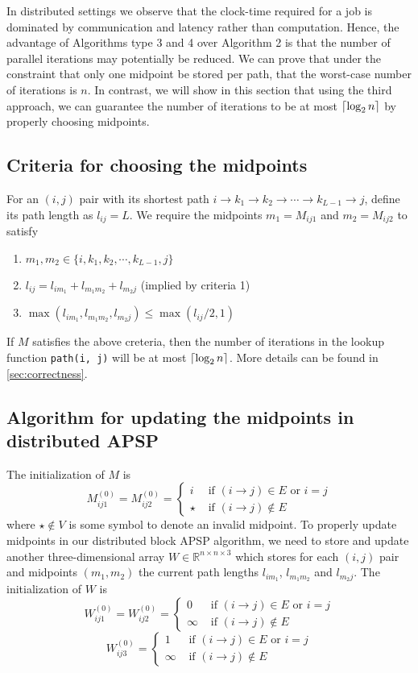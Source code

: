 \documentclass{article} %
\DeclarePairedDelimiter\ceil{\lceil}{\rceil}
\newcommand{\real}{\mathbb{R}}
\begin{document}
In distributed settings we observe that the clock-time required for a
job is dominated by communication and latency rather than computation.
Hence, the advantage of Algorithms type 3 and 4 over Algorithm 2 is
that the number of parallel iterations may potentially be reduced.  We
can prove that under the constraint that only one midpoint be stored
per path, that the worst-case number of iterations is $n$.  In
contrast, we will show in this section that using the third approach,
we can guarantee the number of iterations to be at most $\ceil{\log_2
  n}$ by properly choosing midpoints.

\subsection{Criteria for choosing the midpoints}
For an $(i, j)$ pair with its shortest path $i \to k_1 \to k_2 \to \cdots \to k_{L - 1} \to j$, define its path length as $l_{ij} = L$. We require the midpoints $m_1 = M_{ij1}$ and $m_2 = M_{ij2}$ to satisfy
\begin{enumerate}
\item $m_1, m_2 \in \{i, k_1, k_2, \cdots, k_{L-1}, j\}$
\item $l_{ij} = l_{im_1} + l_{m_1m_2} + l_{m_2j}$ (implied by criteria 1)
\item $\max(l_{im_1}, l_{m_1m_2}, l_{m_2j}) \leq \max(l_{ij}/2, 1)$
\end{enumerate}

If $M$ satisfies the above creteria, then the number of iterations in the lookup function {\tt path(i, j)} will be at most $\ceil{\log_2 n}$. More details can be found in \ref{sec:correctness}.

\subsection{Algorithm for updating the midpoints in distributed APSP}
The initialization of $M$ is 
\[
M_{ij1}^{(0)} = M_{ij2}^{(0)} = 
\begin{cases}
i &\text{ if } (i \to j) \in E \text{ or } i = j\\
\star &\text{ if } (i \to j) \notin E
\end{cases}
\]
where $\star \notin V$ is some symbol to denote an invalid midpoint.
To properly update midpoints in our distributed block APSP algorithm, we need to store and update another three-dimensional array $W \in \real^{n \times n \times 3}$ which stores for each $(i, j)$ pair and midpoints $(m_1, m_2)$ the current path lengths $l_{im_1}$, $l_{m_1m_2}$ and $l_{m_2j}$. The initialization of $W$ is
\[
W_{ij1}^{(0)} = W_{ij2}^{(0)} = 
\begin{cases}
0 &\text{ if } (i \to j) \in E \text{ or } i = j\\
\infty &\text{ if } (i \to j) \notin E
\end{cases}
\]
\[
W_{ij3}^{(0)} = 
\begin{cases}
1 &\text{ if } (i \to j) \in E \text{ or } i = j\\
\infty &\text{ if } (i \to j) \notin E
\end{cases}
\]
\end{document}
